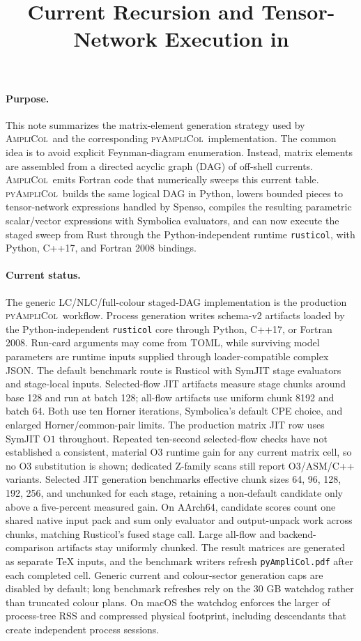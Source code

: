 \documentclass[10pt]{article}
\title{\vspace{-2.0em}Current Recursion and Tensor-Network Execution in \PAC}
\author{}
\date{\vspace{-3.0em}}
\newcommand{\AC}{\textsc{AmpliCol}}
\newcommand{\PAC}{\textsc{pyAmpliCol}}
\begin{document}
\maketitle
\vspace{-1.2em}

\paragraph{Purpose.}
This note summarizes the matrix-element generation strategy used by \AC\ and
the corresponding \PAC\ implementation.  The common idea is to avoid explicit
Feynman-diagram enumeration.  Instead, matrix elements are assembled from a
directed acyclic graph (DAG) of off-shell currents.  \AC\ emits Fortran code
that numerically sweeps this current table.  \PAC\ builds the same logical DAG
in Python, lowers bounded pieces to tensor-network expressions handled by
Spenso, compiles the resulting parametric scalar/vector expressions with
Symbolica evaluators, and can now execute the staged sweep from Rust through
the Python-independent runtime \texttt{rusticol}, with Python, C++17, and
Fortran 2008 bindings.

\paragraph{Current status.}
The generic LC/NLC/full-colour staged-DAG implementation is the production
\PAC\ workflow.  Process generation writes schema-v2 artifacts loaded by
the Python-independent \texttt{rusticol} core through Python, C++17, or
Fortran 2008.  Run-card arguments may come from TOML, while surviving model
parameters are runtime inputs supplied through loader-compatible complex JSON.
The default benchmark route is Rusticol with SymJIT stage
evaluators and stage-local inputs.  Selected-flow JIT artifacts measure stage
chunks around base 128 and run at batch 128; all-flow artifacts use uniform
chunk 8192 and batch 64.  Both use ten Horner iterations, Symbolica's default
CPE choice, and enlarged Horner/common-pair limits.  The production matrix JIT
row uses SymJIT \(\mathrm{O}1\) throughout.  Repeated ten-second selected-flow
checks have not established a consistent, material O3 runtime gain for any
current matrix cell, so no O3 substitution is shown; dedicated Z-family scans
still report O3/ASM/C++ variants.  Selected JIT generation benchmarks effective
chunk sizes 64, 96, 128, 192, 256, and unchunked for each stage, retaining a
non-default candidate only above a five-percent measured gain.  On AArch64,
candidate scores count one shared native input pack and sum only evaluator and
output-unpack work across chunks, matching Rusticol's fused stage call.  Large all-flow
and backend-comparison artifacts stay uniformly chunked.  The result matrices
are generated as separate
\TeX{} inputs, and the benchmark writers refresh \texttt{pyAmpliCol.pdf}
after each completed cell.  Generic current and colour-sector generation caps
are disabled by default; long benchmark refreshes rely on the 30 GB watchdog
rather than truncated colour plans.  On macOS the watchdog enforces the larger
of process-tree RSS and compressed physical footprint, including descendants
that create independent process sessions.
\end{document}
